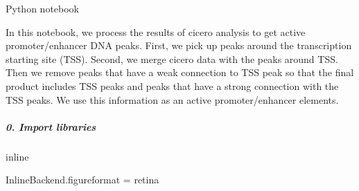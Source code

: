 \documentclass[letterpaper,10pt,english]{sphinxmanual}
\begin{document}
Python notebook

In this notebook, we process the results of cicero analysis to get active promoter/enhancer DNA peaks. First, we pick up peaks around the transcription starting site (TSS). Second, we merge cicero data with the peaks around TSS. Then we remove peaks that have a weak connection to TSS peak so that the final product includes TSS peaks and peaks that have a strong connection with the TSS peaks. We use this information as an active promoter/enhancer elements.


\subparagraph{0. Import libraries}
\label{\detokenize{notebooks/01_ATAC-seq_data_processing/option1_scATAC-seq_data_analysis_with_cicero/02_preprocess_peak_data:0.-Import-libraries}}\label{\detokenize{notebooks/01_ATAC-seq_data_processing/option1_scATAC-seq_data_analysis_with_cicero/02_preprocess_peak_data::doc}}
{
\begin{sphinxVerbatim}[commandchars=\\\{\}]
\llap{\color{nbsphinxin}[1]:\,\hspace{\fboxrule}\hspace{\fboxsep}}   
   
   
 inline

   


     
   

     
\end{sphinxVerbatim}
}

{
\begin{sphinxVerbatim}[commandchars=\\\{\}]
\llap{\color{nbsphinxin}[2]:\,\hspace{\fboxrule}\hspace{\fboxsep}} InlineBackend.figure\PYGZus{}format = \PYGZsq{}retina\PYGZsq{}

\PYG{p}{[}\PYG{p}{]}  \PYG{p}{[} \PYG{p}{]}
\PYG{p}{[}\PYG{p}{]}  
\end{sphinxVerbatim}
}
\end{document}

